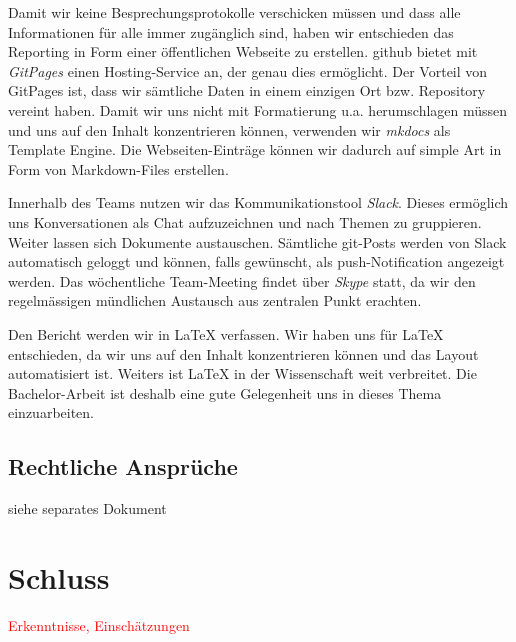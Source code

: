 \documentclass[a4paper,ngerman, 11pt]{report}
\newcommand\Diskussionspunkt[1]{\textcolor{red}{#1}}
\begin{document}
Damit wir keine Besprechungsprotokolle verschicken müssen und dass alle Informationen für alle immer zugänglich sind, haben wir entschieden das Reporting in Form einer öffentlichen Webseite zu erstellen. github bietet mit \textit{GitPages} einen Hosting-Service an, der genau dies ermöglicht. Der Vorteil von GitPages ist, dass wir sämtliche Daten in einem einzigen Ort bzw. Repository vereint haben. Damit wir uns nicht mit Formatierung u.a. herumschlagen müssen und uns auf den Inhalt konzentrieren können, verwenden wir \textit{mkdocs} als Template Engine. Die Webseiten-Einträge können wir dadurch auf simple Art in Form von Markdown-Files erstellen.

Innerhalb des Teams nutzen wir das Kommunikationstool \textit{Slack}. Dieses ermöglich uns Konversationen als Chat aufzuzeichnen und nach Themen zu gruppieren. Weiter lassen sich Dokumente austauschen. Sämtliche git-Posts werden von Slack automatisch geloggt und können, falls gewünscht, als push-Notification angezeigt werden.
Das wöchentliche Team-Meeting findet über \textit{Skype} statt, da wir den regelmässigen mündlichen Austausch aus zentralen Punkt erachten.

Den Bericht werden wir in LaTeX verfassen. Wir haben uns für LaTeX entschieden, da wir uns auf den Inhalt konzentrieren können und das Layout automatisiert ist. Weiters ist LaTeX in der Wissenschaft weit verbreitet. Die Bachelor-Arbeit ist deshalb eine gute Gelegenheit uns in dieses Thema einzuarbeiten.


\section{Rechtliche Ansprüche}
siehe separates Dokument


\chapter{Schluss}
\Diskussionspunkt{Erkenntnisse, Einschätzungen}




{}	

\end{document}
